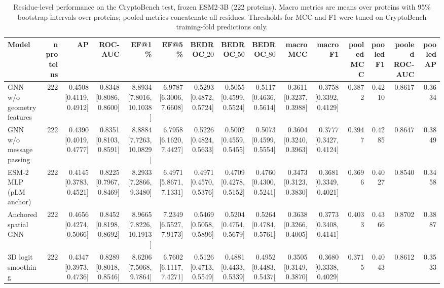 \begin{table}[t]
\centering
\small
\caption{Residue-level performance on the CryptoBench test, frozen ESM2-3B (222 proteins). Macro metrics are means over proteins with 95\% bootstrap intervals over proteins; pooled metrics concatenate all residues. Thresholds for MCC and F1 were tuned on CryptoBench training-fold predictions only.}
\label{tab:table_absolute}
\begin{tabular}{lrrrrrrrrrrrrrr}
\toprule
Model & n proteins & AP & ROC-AUC & EF@1\% & EF@5\% & BEDROC$\_{20}$ & BEDROC$\_{50}$ & BEDROC$\_{80}$ & macro MCC & macro F1 & pooled MCC & pooled F1 & pooled ROC-AUC & pooled AP \\
\midrule
GNN w/o geometry features & 222 & 0.4508 [0.4119, 0.4912] & 0.8348 [0.8086, 0.8600] & 8.8934 [7.8016, 10.1038] & 6.9787 [6.3006, 7.6608] & 0.5293 [0.4872, 0.5724] & 0.5055 [0.4599, 0.5524] & 0.5117 [0.4636, 0.5614] & 0.3611 [0.3237, 0.3988] & 0.3758 [0.3392, 0.4129] & 0.3872 & 0.4210 & 0.8617 & 0.3634 \\
GNN w/o message passing & 222 & 0.4390 [0.4019, 0.4777] & 0.8351 [0.8103, 0.8591] & 8.8884 [7.7263, 10.0829] & 6.7958 [6.1620, 7.4427] & 0.5226 [0.4824, 0.5633] & 0.5002 [0.4559, 0.5455] & 0.5073 [0.4599, 0.5554] & 0.3604 [0.3240, 0.3963] & 0.3777 [0.3427, 0.4124] & 0.3947 & 0.4285 & 0.8647 & 0.3849 \\
ESM-2 MLP (pLM anchor) & 222 & 0.4145 [0.3783, 0.4521] & 0.8225 [0.7967, 0.8469] & 8.2933 [7.2866, 9.3480] & 6.4971 [5.8671, 7.1331] & 0.4971 [0.4570, 0.5376] & 0.4709 [0.4278, 0.5152] & 0.4760 [0.4300, 0.5241] & 0.3473 [0.3123, 0.3830] & 0.3681 [0.3349, 0.4021] & 0.3696 & 0.4027 & 0.8540 & 0.3458 \\
Anchored spatial GNN & 222 & 0.4656 [0.4274, 0.5066] & 0.8452 [0.8198, 0.8692] & 8.9665 [7.8226, 10.1913] & 7.2349 [6.5527, 7.9173] & 0.5469 [0.5058, 0.5896] & 0.5204 [0.4754, 0.5679] & 0.5264 [0.4784, 0.5761] & 0.3638 [0.3266, 0.4005] & 0.3773 [0.3408, 0.4141] & 0.4033 & 0.4366 & 0.8702 & 0.3887 \\
3D logit smoothing & 222 & 0.4347 [0.3973, 0.4736] & 0.8289 [0.8018, 0.8546] & 8.6206 [7.5068, 9.7864] & 6.7602 [6.1117, 7.4271] & 0.5126 [0.4713, 0.5549] & 0.4881 [0.4433, 0.5339] & 0.4952 [0.4483, 0.5437] & 0.3505 [0.3149, 0.3870] & 0.3680 [0.3338, 0.4029] & 0.3715 & 0.4043 & 0.8612 & 0.3533 \\
\bottomrule
\end{tabular}
\end{table}

